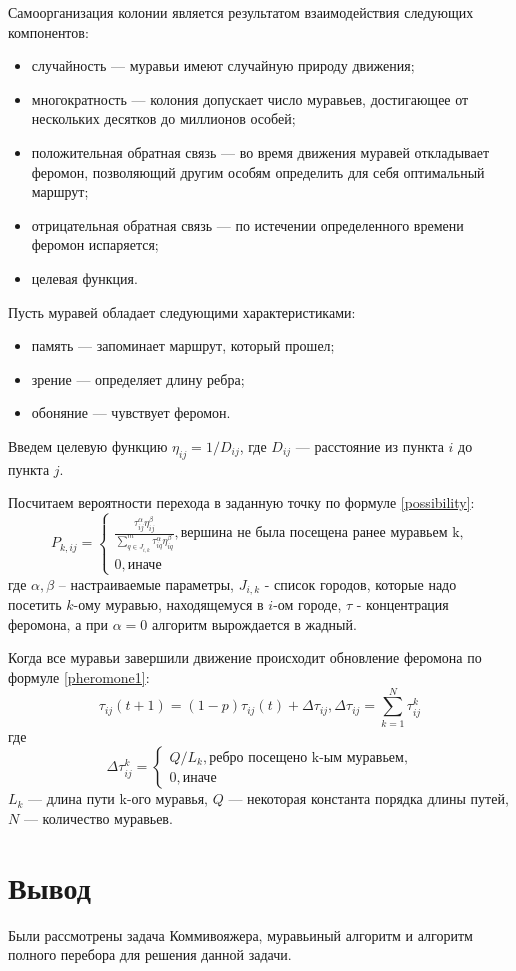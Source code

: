 Самоорганизация колонии является результатом взаимодействия следующих компонентов:
\begin{itemize}
    \item случайность — муравьи имеют случайную природу движения;
    \item многократность — колония допускает число муравьев, достигающее от нескольких десятков до миллионов особей;
    \item положительная обратная связь — во время движения муравей откладывает феромон, позволяющий другим особям определить для себя оптимальный маршрут;
    \item отрицательная обратная связь — по истечении определенного времени феромон испаряется;
    \item целевая функция.
\end{itemize}

Пусть муравей обладает следующими характеристиками:
\begin{itemize}
    \item память — запоминает маршрут, который прошел;
    \item зрение — определяет длину ребра;
    \item обоняние — чувствует феромон.
\end{itemize}

Введем целевую функцию $\eta_{ij} = 1 / D_{ij}$, где $D_{ij}$ — расстояние из пункта $i$ до пункта $j$.

Посчитаем вероятности перехода в заданную точку по формуле \eqref{possibility}:
\begin{equation}
    \label{possibility}
    P_{k,ij} = \begin{cases}
        \frac{\tau_{ij}^\alpha\eta_{ij}^\beta}{\sum_{q \in J_{i,k}}^m \tau^\alpha_{iq}\eta^\beta_{iq}}, \textrm{вершина не была посещена ранее муравьем k,} \\
        0, \textrm{иначе}
    \end{cases}
\end{equation}
где $\alpha, \beta$ -- настраиваемые параметры, $J_{i,k}$ - список городов, которые надо посетить $k$-ому муравью, находящемуся в $i$-ом городе, $\tau$ - концентрация феромона, а при $\alpha = 0$ алгоритм вырождается в жадный.

Когда все муравьи завершили движение происходит обновление феромона по формуле \eqref{pheromone1}:
\begin{equation}
    \label{pheromone1}
    \tau_{ij}(t+1) = (1-p)\tau_{ij}(t) + \Delta \tau_{ij}, \Delta \tau_{ij} = \sum_{k=1}^N \tau^k_{ij}
\end{equation}
где
\begin{equation}
    \label{pheromone2}
    \Delta \tau^k_{ij} = \begin{cases}
        Q/L_{k}, \textrm{ребро посещено k-ым муравьем,} \\
        0, \textrm{иначе}
    \end{cases}
\end{equation}
$L_{k}$ — длина пути k-ого муравья, $Q$ — некоторая константа порядка длины путей, $N$ — количество муравьев.

\section*{Вывод}
Были рассмотрены задача Коммивояжера, муравьиный алгоритм и алгоритм полного перебора для решения данной задачи.
